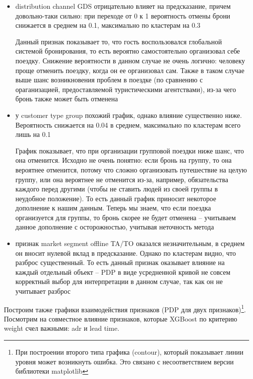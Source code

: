 \begin{itemize}
	\item distribution channel GDS отрицательно влияет на предсказание, причем довольно-таки сильно: при переходе от 0 к 1 вероятность отмены брони снижается в среднем на 0.1, максимально по кластерам на 0.3
	
	Данный признак показывает то, что гость воспользовался глобальной системой бронирования, то есть вероятно самостоятельно организовал себе поездку. Снижение вероятности в данном случае не очень логично: человеку проще отменить поездку, когда он ее организовал сам. Также в таком случае выше шанс возникновения проблем в поездке (по сравнению с ораганизацией, предоставляемой туристическими агентствами), из-за чего бронь также может быть отменена
	
	\item у customer type group похожий график, однако влияние существенно ниже. Вероятность снижается на 0.04 в среднем, максимально по кластерам всего лишь на 0.1
	
	График показывает, что при организации групповой поездки ниже шанс, что она отменится. Исходно не очень понятно: если бронь на группу, то она вероятнее отменится, потому что сложно организовать путешествие на целую группу, или она вероятнее не отменится из-за, например, обязательства каждого перед другими (чтобы не ставить людей из своей группы в неудобное положение). То есть данный график приносит некоторое дополнение к нашим данным. Теперь мы знаем, что если поездка организуется для группы, то бронь скорее не будет отменена -- учитываем данное дополнение с осторожностью, учитывая неточность метода
	
	\item признак market segment offline TA/TO оказался незначительным, в среднем он вносит нулевой вклад в предсказание. Однако по кластерам видно, что разброс существенный. То есть данный признак оказывает влияние на каждый отдельный объект -- PDP в виде усредненной кривой не совсем корректный выбор для интерпретации в данном случае, так как он не учитывает разброс
\end{itemize}

Построим также графики взаимодействия признаков (PDP для двух признаков)\footnote{При построении второго типа графика (contour), который показывает линии уровня может возникнуть ошибка. Это связано с несоответствием версии библиотеки matplotlib}. Посмотрим на совместное влияние признаков, которые XGBoost по критерию weight счел важными: adr и lead time.

